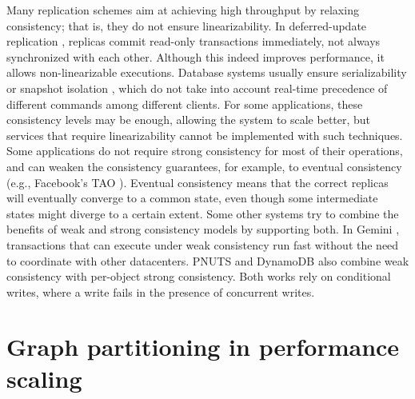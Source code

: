 Many replication schemes aim at achieving high throughput by relaxing
consistency; that is, they do not ensure linearizability. In deferred-update
replication \cite{chundi96dur, kobus2013hybrid, sciascia2012sdur, SousaOMP01},
replicas commit read-only transactions immediately, not always synchronized
with each other. Although this indeed improves performance, it allows
non-linearizable executions. Database systems usually ensure serializability
\cite{BHG87} or snapshot isolation \cite{LinKJPA09}, which do not take into
account real-time precedence of different commands among different clients. For
some applications, these consistency levels may be enough, allowing the system
to scale better, but services that require linearizability cannot be implemented
with such techniques. Some applications do not require strong consistency for
most of their operations, and can weaken the consistency guarantees, for example, to eventual
consistency (e.g., Facebook's TAO \cite{facebookTAO}). Eventual consistency
\cite{Gustavsson:2002eventual} means that the correct replicas will eventually
converge to a common state, even though some intermediate states might diverge
to a certain extent. Some other systems try to combine the benefits of weak and
strong consistency models by supporting both.  In Gemini \cite{Li2012geo},
transactions that can execute under weak consistency run fast without the need
to coordinate with other datacenters. PNUTS \cite{Cooper2008PNUTSYH} and
DynamoDB \cite{Sivasubramanian:2012dynamo} also combine weak consistency with
per-object strong consistency. Both works rely on conditional writes, where a
write fails in the presence of concurrent writes.

\section{Graph partitioning in performance scaling}


